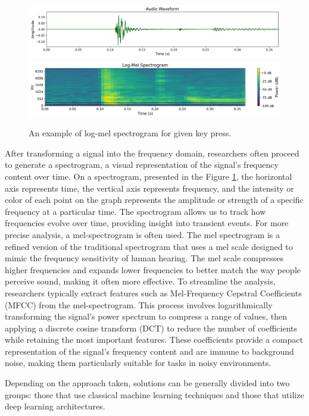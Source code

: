 \documentclass[a4paper,11pt,twoside]{report}
\theoremstyle{definition}
\begin{document}
\begin{figure}[h!]
    \centering
    \includegraphics[width=0.9\linewidth]{img_related_work/waveform.png}
    \includegraphics[width=0.9\linewidth]{img_related_work/log_mel_spectrogram.png}
    \caption{An example of log-mel spectrogram for given key press.}
    \label{fig:spectogram}
\end{figure}

After transforming a signal into the frequency domain, researchers often proceed to generate a spectrogram, a visual representation of the signal's frequency content over time. On a spectrogram, presented in the Figure \ref{fig:spectogram}, the horizontal axis represents time, the vertical axis represents frequency, and the intensity or color of each point on the graph represents the amplitude or strength of a specific frequency at a particular time. The spectrogram allows us to track how frequencies evolve over time, providing insight into transient events. For more precise analysis, a mel-spectrogram is often used. The mel spectrogram is a refined version of the traditional spectrogram that uses a mel scale designed to mimic the frequency sensitivity of human hearing. The mel scale compresses higher frequencies and expands lower frequencies to better match the way people perceive sound, making it often more effective. To streamline the analysis, researchers typically extract features such as Mel-Frequency Cepstral Coefficients (MFCC) from the mel-spectrogram. This process involves logarithmically transforming the signal's power spectrum to compress a range of values, then applying a discrete cosine transform (DCT) to reduce the number of coefficients while retaining the most important features. These coefficients provide a compact representation of the signal's frequency content and are immune to background noise, making them particularly suitable for tasks in noisy environments.

Depending on the approach taken, solutions can be generally divided into two groups: those that use classical machine learning techniques and those that utilize deep learning architectures.
\end{document}
